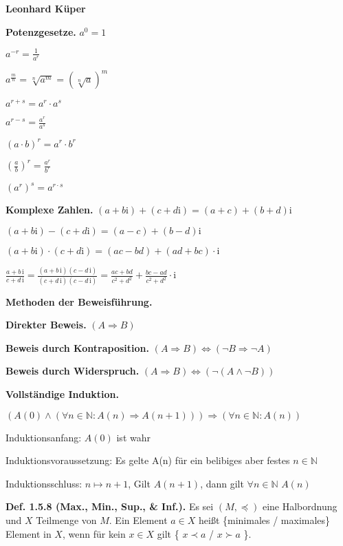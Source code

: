 \documentclass[ngerman]{article}
\begin{document}
\begin{multicols}{4}
\begin{tiny}

\textbf{Leonhard Küper}

\textbf{Potenzgesetze.} $a^{0}=1$

$a^{-r}=\frac{1}{a^{r}}$

$a^{\frac{m}{n}}=\sqrt[n]{a^{m}}=\left(\sqrt[n]{a}\right)^{m}$

$a^{r+s}=a^{r}\cdot a^{s}$

$a^{r-s}=\frac{a^{r}}{a^{s}}$

$(a\cdot b)^{r}=a^{r}\cdot b^{r}$

$\left(\frac{a}{b}\right)^{r}=\frac{a^{r}}{b^{r}}$

$\left(a^{r}\right)^{s}=a^{r\cdot s}$

\textbf{Komplexe Zahlen.} $(a+b\mathrm i)+(c+d\mathrm i)=(a+c)+(b+d)\mathrm i$

$(a + b \mathrm i) - (c + d \mathrm i) = (a - c) + (b - d) \mathrm i$

$(a+b\mathrm{i})\cdot(c+d\mathrm{i})=(ac-bd) + (ad+bc)\cdot\mathrm i$

$\frac{a+b\,\mathrm i}{c+d\,\mathrm i} = \frac{(a+b\,\mathrm i)(c-d\,\mathrm i)}{(c+d\,\mathrm i)(c-d\,\mathrm i)} = \frac{ac+bd}{c^2+d^2}+\frac{bc-ad}{c^2+d^2}\cdot\mathrm i$

\textbf{Methoden der Beweisführung.}

\textbf{Direkter Beweis.} $(A \Rightarrow B)$

\textbf{Beweis durch Kontraposition.} $(A \Rightarrow B) \Leftrightarrow (\neg B \Rightarrow \neg A)$

\textbf{Beweis durch Widerspruch.} $(A \Rightarrow B ) \Leftrightarrow (\neg (A \wedge \neg B))$

\textbf{Vollständige Induktion.}

$(A(0) \wedge ( \forall  n \in \mathbb N : A(n) \Rightarrow A(n+1))) \Rightarrow \left(\forall n \in \mathbb N \colon A(n)\right)$

Induktionsanfang: $A(0)$ ist wahr

Induktionsvoraussetzung: Es gelte A(n) für ein belibiges aber festes $n \in \mathbb N$

Induktionsschluss: $n \mapsto n+1$, Gilt $A(n+1)$, dann gilt  $\forall n \in \mathbb{N}$ $A(n)$

\textbf{Def. 1.5.8 (Max., Min., Sup., \& Inf.).} Es sei $(M,\preceq)$ eine Halbordnung und $X$ Teilmenge von $M$. Ein Element $a\in X$ heißt \{minimales / maximales\} Element in $X$, wenn für kein $x\in X$ gilt \{ $x\prec a$ / $x \succ a$ \}.


\end{tiny}
\end{multicols}
\end{document}

